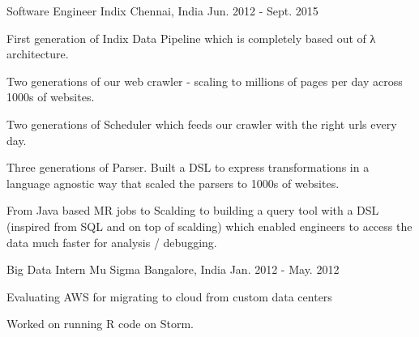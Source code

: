 \begin{cventries}
  \cventry
    {Software Engineer} %
    {Indix} %
    {Chennai, India} %
    {Jun. 2012 - Sept. 2015} %
    {
      \begin{cvitems} %
        \item {First generation of Indix Data Pipeline which is completely based out of λ architecture. }
        \item {Two generations of our web crawler - scaling to millions of pages per day across 1000s of websites. }
        \item {Two generations of Scheduler which feeds our crawler with the right urls every day. }
        \item {Three generations of Parser. Built a DSL to express transformations in a language agnostic way that scaled the parsers to 1000s of websites. }
        \item {From Java based MR jobs to Scalding to building a query tool with a DSL (inspired from SQL and on top of scalding) which enabled engineers to access the data much faster for analysis / debugging. }
      \end{cvitems}
    }

  \cventry
    {Big Data Intern} %
    {Mu Sigma} %
    {Bangalore, India} %
    {Jan. 2012 - May. 2012} %
    {
      \begin{cvitems} %
        \item {Evaluating AWS for migrating to cloud from custom data centers}
        \item {Worked on running R code on Storm.}
      \end{cvitems}
    }

\end{cventries}
